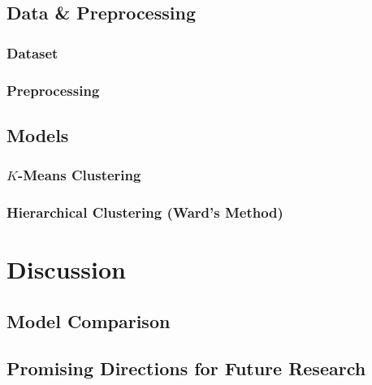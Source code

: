 \documentclass[letterpaper]{article}
\theoremstyle{definition}
\begin{document}
\subsection{Data \& Preprocessing}\label{subsec:data}
\subsubsection{Dataset}
\subsubsection{Preprocessing}
\subsection{Models}
\subsubsection{$K$-Means Clustering}
\subsubsection{Hierarchical Clustering (Ward's Method)}
\section{Discussion}\label{sec:discussion}
\subsection{Model Comparison}\label{subsec:comparison}
\subsection{Promising Directions for Future Research}\label{subsec:future}

\newpage


\end{document}
